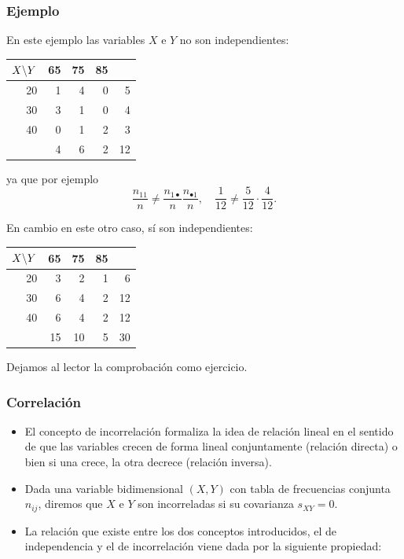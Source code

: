 \begin{frame}
\frametitle{Ejemplo}
En este ejemplo las variables $X$ e $Y$ no son independientes: 
\begin{center}
\begin{tabular}{r|rrr|r}
$X  \mbox{\mbox{\textbackslash}}Y$ & 65 & 75 & 85 & \\ \hline 20 & 1 & 4 & 0 & 5 \\ 30 & 3 & 1 & 0 & 4 \\ 40 & 0 & 1 &
2 & 3 \\ \hline & 4 & 6 & 2 & 12
\end{tabular}
\end{center}
ya  que por ejemplo
$$
\frac{n_{11}}{n}\not=  \frac{n_{1\bullet}}{n}\frac{n_{\bullet 1}}{n},\quad
\frac{1}{12}\not= \frac{5}{12}\cdot\frac{4}{12}.
$$
\end{frame}

\begin{frame}
En cambio en este otro caso, sí son independientes: 
\begin{center}
\begin{tabular}{r|rrr|r}
$X  \mbox{\mbox{\textbackslash}}Y$ & 65 & 75 & 85 & \\ \hline 20 & 3 & 2 & 1 & 6 \\ 30 & 6 & 4 & 2 & 12 \\ 40 & 6 & 4
& 2 & 12 \\ \hline
 & 15 & 10 & 5 & 30
\end{tabular}
\end{center}
Dejamos al lector la comprobación como ejercicio.
\end{frame}

\begin{frame}
\frametitle{Correlación}
\begin{itemize}
\item El concepto de incorrelación formaliza la idea de relación lineal en el sentido de que
las variables crecen de forma lineal conjuntamente (relación directa) o bien  si una
crece, la otra decrece (relación inversa).
\item  Dada una variable bidimensional  $(X,Y)$ con
tabla de frecuencias conjunta $n_{ij}$, diremos que $X$ e $Y$
son incorreladas si su covarianza    $s_{XY}=0$.
\item La relación que existe entre los dos conceptos introducidos, el de independencia   y el
de incorrelación viene dada por la siguiente propiedad:
\end{itemize}
\end{frame}

